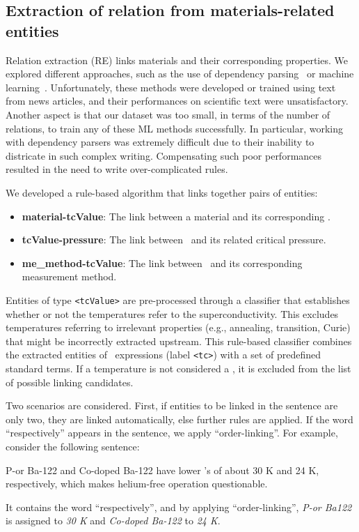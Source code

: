 \subsection{Extraction of relation from materials-related entities}
\label{subsec:re-solution}
\label{subsubsec:linking}

Relation extraction (RE) links materials and their corresponding properties. 
We explored different approaches, such as the use of dependency parsing~\cite{yoshikawa:2017acl, Tiktinsky2020pyBARTES, swayamdipta:17, zhou-zhao-2019-head} or machine learning~\cite{lin2016neural,hariharan2019relation}. 
Unfortunately, these methods were developed or trained using text from news articles, and their performances on scientific text were unsatisfactory. 
Another aspect is that our dataset was too small, in terms of the number of relations, to train any of these ML methods successfully. 
In particular, working with dependency parsers was extremely difficult due to their inability to districate in such complex writing. 
Compensating such poor performances resulted in the need to write over-complicated rules. 

We developed a rule-based algorithm that links together pairs of entities:
\begin{itemize}
    \item \textbf{material-tcValue}: The link between a material and its corresponding \tc.
    \item \textbf{tcValue-pressure}: The link between \tc~and its related critical pressure.
    \item \textbf{me\_method-tcValue}: The link between \tc~and its corresponding measurement method.
\end{itemize}

Entities of type \texttt{<tcValue>} are pre-processed through a classifier that establishes whether or not the temperatures refer to the superconductivity. This excludes temperatures referring to irrelevant properties (e.g., annealing, transition, Curie) that might be incorrectly extracted upstream.
This rule-based classifier combines the extracted entities of \tc~expressions (label \texttt{<tc>}) with a set of predefined standard terms.
If a temperature is not considered a \tc, it is excluded from the list of possible linking candidates.

Two scenarios are considered. First, if entities to be linked in the sentence are only two, they are linked automatically, else further rules are applied. 
If the word ``respectively'' appears in the sentence, we apply ``order-linking''. 
For example, consider the following sentence:
\begin{displayquote}
    P-or Ba-122  and Co-doped Ba-122 have lower \tc's of about 30 K and 24 K, respectively, which makes helium-free operation questionable.
\end{displayquote}
It contains the word ``respectively'', and by applying ``order-linking'', \textit{P-or Ba122} is assigned to \textit{30 K} and \textit{Co-doped Ba-122} to \textit{24 K}.


